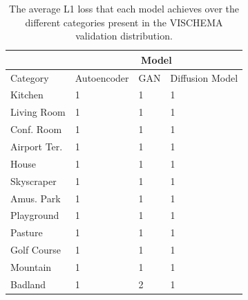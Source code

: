 \documentclass{UoYCSproject}
\begin{document}
\begin{table}[]
    \centering
    \begin{tabular}{|l|lll|}
        \hline
        \multicolumn{1}{|c|}{} & \multicolumn{3}{c|}{Model}                                                                         \\ \hline
        Category               & \multicolumn{1}{c|}{Autoencoder} & \multicolumn{1}{c|}{GAN} & \multicolumn{1}{c|}{Diffusion Model} \\ \hline
        Kitchen                & \multicolumn{1}{l|}{1}           & \multicolumn{1}{l|}{1}   & 1                                    \\ \hline
        Living Room            & \multicolumn{1}{l|}{1}           & \multicolumn{1}{l|}{1}   & 1                                    \\ \hline
        Conf. Room             & \multicolumn{1}{l|}{1}           & \multicolumn{1}{l|}{1}   & 1                                    \\ \hline
        Airport Ter.           & \multicolumn{1}{l|}{1}           & \multicolumn{1}{l|}{1}   & 1                                    \\ \hline
        House                  & \multicolumn{1}{l|}{1}           & \multicolumn{1}{l|}{1}   & 1                                    \\ \hline
        Skyscraper             & \multicolumn{1}{l|}{1}           & \multicolumn{1}{l|}{1}   & 1                                    \\ \hline
        Amus. Park             & \multicolumn{1}{l|}{1}           & \multicolumn{1}{l|}{1}   & 1                                    \\ \hline
        Playground             & \multicolumn{1}{l|}{1}           & \multicolumn{1}{l|}{1}   & 1                                    \\ \hline
        Pasture                & \multicolumn{1}{l|}{1}           & \multicolumn{1}{l|}{1}   & 1                                    \\ \hline
        Golf Course            & \multicolumn{1}{l|}{1}           & \multicolumn{1}{l|}{1}   & 1                                    \\ \hline
        Mountain               & \multicolumn{1}{l|}{1}           & \multicolumn{1}{l|}{1}   & 1                                    \\ \hline
        Badland                & \multicolumn{1}{l|}{1}           & \multicolumn{1}{l|}{2}   & 1                                    \\ \hline
    \end{tabular}
    \label{tab:categories}
    \caption{The average L1 loss that each model achieves over the different categories present in the VISCHEMA validation distribution.}
\end{table}
\end{document}
